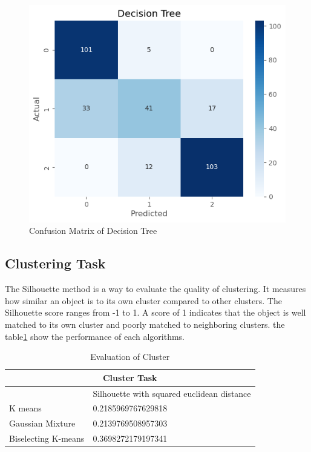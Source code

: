     \begin{figure}[H]
        \includegraphics[scale=0.7]{imgs/dc}
        \centering
        \caption{Confusion Matrix of Decision Tree}
        \label{cmdt}
    \end{figure}

\subsection{Clustering Task}

The Silhouette method is a way to evaluate the quality of clustering. It measures how similar an object is to its own cluster compared to other clusters. The Silhouette score ranges from -1 to 1. A score of 1 indicates that the object is well matched to its own cluster and poorly matched to neighboring clusters.
the table\ref{cluster} show the performance of each algorithms.
\begin{table}[]
    \begin{tabular}{ll}
    \hline
    \multicolumn{2}{c}{Cluster Task}                                                     \\ \hline
                        & \multicolumn{1}{c}{Silhouette with squared euclidean distance} \\
    K means             & 0.2185969767629818                                             \\
    Gaussian Mixture    & 0.2139769508957303                                             \\
    Biselecting K-means & 0.3698272179197341     \\ \bottomrule
    \end{tabular}
    \caption{Evaluation of Cluster}
    \label{cluster}    
    \end{table}